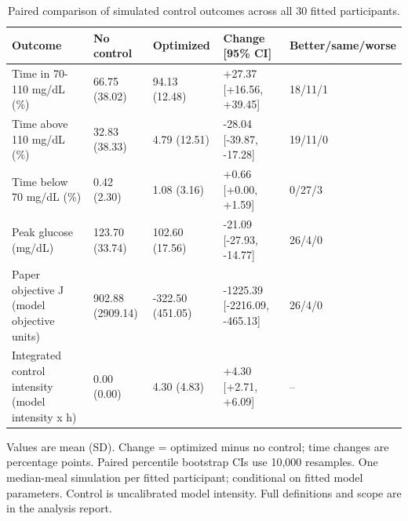 \begin{table}[htbp]
\centering
\footnotesize
\caption{Paired comparison of simulated control outcomes across all 30 fitted participants.}
\label{tab:control-cohort}
\begin{tabular}{p{.22\linewidth}p{.14\linewidth}p{.14\linewidth}p{.24\linewidth}p{.13\linewidth}}
\hline
Outcome & No control & Optimized & Change [95\% CI] & Better/same/worse \\
\hline
Time in 70-110 mg/dL (\%) & 66.75 (38.02) & 94.13 (12.48) & +27.37 [+16.56, +39.45] & 18/11/1 \\
Time above 110 mg/dL (\%) & 32.83 (38.33) & 4.79 (12.51) & -28.04 [-39.87, -17.28] & 19/11/0 \\
Time below 70 mg/dL (\%) & 0.42 (2.30) & 1.08 (3.16) & +0.66 [+0.00, +1.59] & 0/27/3 \\
Peak glucose (mg/dL) & 123.70 (33.74) & 102.60 (17.56) & -21.09 [-27.93, -14.77] & 26/4/0 \\
Paper objective J (model objective units) & 902.88 (2909.14) & -322.50 (451.05) & -1225.39 [-2216.09, -465.13] & 26/4/0 \\
Integrated control intensity (model intensity x h) & 0.00 (0.00) & 4.30 (4.83) & +4.30 [+2.71, +6.09] & -- \\
\hline
\end{tabular}
\par\smallskip
\begin{minipage}{\textwidth}
\scriptsize
Values are mean (SD). Change = optimized minus no control; time changes are percentage points. Paired percentile bootstrap CIs use 10,000 resamples. One median-meal simulation per fitted participant; conditional on fitted model parameters. Control is uncalibrated model intensity. Full definitions and scope are in the analysis report.
\end{minipage}
\end{table}
